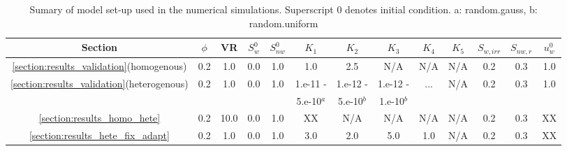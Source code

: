 
\begin{landscape}
\begin{table}
  \begin{tabular}{c | c c  c  c  c  c  c  c  c  c  c   c}
    \hline
      {\bf Section} & $\phi$ & VR  & $S^{0}_{w}$ & $S^{0}_{nw}$ & $K_{1}$ & $K_{2}$ & $K_{3}$ & $K_{4}$ & $K_{5}$ & $S_{w,irr}$ & $S_{nw,r}$ & $u^{0}_{w}$ \\ 
    \hline
      \ref{section:results_validation}(homogenous) & 0.2  & 1.0  & 0.0  & 1.0  & 1.0  & 2.5  & N/A  & N/A  & N/A & 0.2  & 0.3 & 1.0 \\
      \ref{section:results_validation}(heterogenous) & 0.2  & 1.0  & 0.0  & 1.0  & 1.e-11 - & 1.e-12 - & 1.e-12 - & ... & N/A & 0.2  & 0.3 & 1.0 \\
      &   &  &  &  & 5.e-10$^a$ & 5.e-10$^b$ & 1.e-10$^b$  &  &  &  & & \\
      \ref{section:results_homo_hete}  & 0.2  & 10.0 & 0.0  & 1.0  &  XX  & N/A  & N/A  & N/A  & N/A & 0.2  & 0.3 & XX  \\
      \ref{section:results_hete_fix_adapt}  & 0.2  & 1.0  & 0.0  & 1.0  &  3.0  & 2.0  & 5.0  & 1.0  & N/A & 0.2  & 0.3 & XX  \\
      \hline
   \end{tabular}
   \caption{Sumary of model set-up used in the numerical simulations. Superscript $0$ denotes initial condition. a: random.gauss, b: random.uniform }\label{table:setup}
\end{table}
\end{landscape}
\clearpage






